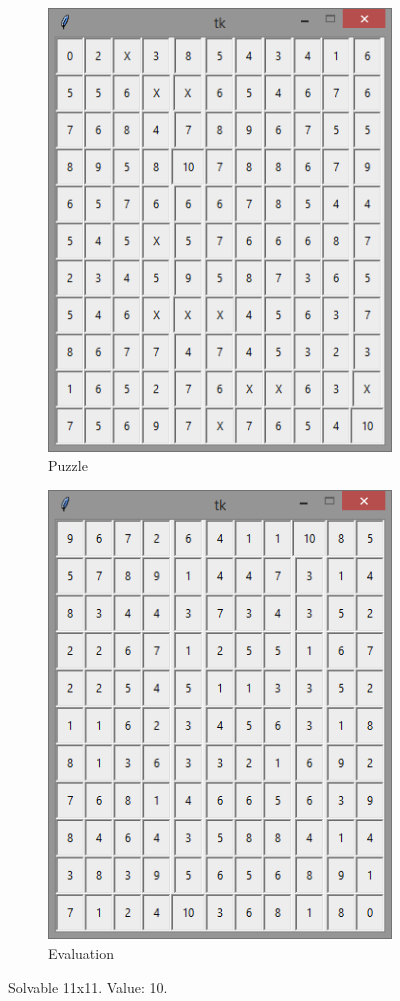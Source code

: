 \documentclass[12pt]{article}
\begin{document}
\begin{figure}[H]
	\begin{subfigure}{.5\textwidth}
		\centering
     		\includegraphics[width = .6\linewidth]{11x11_1_puzzle_10}
     		\caption{Puzzle}
     		\label{fig8:sfig1}
	\end{subfigure}
	\begin{subfigure}{.5\textwidth}
		\centering
		\includegraphics[width = .6\linewidth]{11x11_1_eval_10}
		\caption{Evaluation}
		\label{fig8:sfig2}
	\end{subfigure}
\caption{Solvable 11x11. Value: 10.}
\label{fig:11x11good}
\end{figure}
\end{document}
